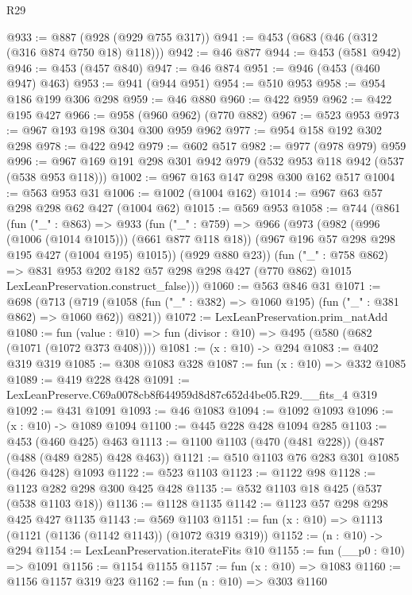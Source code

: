 \begin{lexlean}{R29}
\begin{coremodule}
@933 := @887 (@928 (@929 @755 @317))
@941 := @453 (@683 (@46 (@312 (@316 @874 @750 @18) @118)))
@942 := @46 @877
@944 := @453 (@581 @942)
@946 := @453 (@457 @840)
@947 := @46 @874
@951 := @946 (@453 (@460 @947) @463)
@953 := @941 (@944 @951)
@954 := @510 @953
@958 := @954 @186 @199 @306 @298
@959 := @46 @880
@960 := @422 @959
@962 := @422 @195 @427
@966 := @958 (@960 @962) (@770 @882)
@967 := @523 @953
@973 := @967 @193 @198 @304 @300 @959 @962
@977 := @954 @158 @192 @302 @298
@978 := @422 @942
@979 := @602 @517
@982 := @977 (@978 @979) @959
@996 := @967 @169 @191 @298 @301 @942 @979 (@532 @953 @118 @942 (@537 (@538 @953 @118)))
@1002 := @967 @163 @147 @298 @300 @162 @517
@1004 := @563 @953 @31
@1006 := @1002 (@1004 @162)
@1014 := @967 @63 @57 @298 @298 @62 @427 (@1004 @62)
@1015 := @569 @953
@1058 := @744
    (@861
      (fun ("_" : @863) =>
      @933
        (fun ("_" : @759) =>
        @966
          (@973
            (@982 (@996 (@1006 (@1014 @1015))) (@661 @877 @118 @18))
            (@967 @196 @57 @298 @298 @195 @427 (@1004 @195) @1015))
          (@929 @880 @23))
        (fun ("_" : @758 @862) =>
        @831
          @953
          @202
          @182
          @57
          @298
          @298
          @427
          (@770 @862)
          @1015
          LexLeanPreservation.construct_false)))
@1060 := @563 @846 @31
@1071 := @698
    (@713 (@719 (@1058 (fun ("_" : @382) => @1060 @195) (fun ("_" : @381 @862) => @1060 @62)) @821))
@1072 := LexLeanPreservation.prim_natAdd
@1080 := fun (value : @10) => fun (divisor : @10) => @495 (@580 (@682 (@1071 (@1072 @373 @408))))
@1081 := (x : @10) -> @294
@1083 := @402 @319 @319
@1085 := @308 @1083 @328
@1087 := fun (x : @10) => @332 @1085
@1089 := @419 @228 @428
@1091 := LexLeanPreserve.C69a0078cb8f644959d8d87c652d4be05.R29.__fits_4 @319
@1092 := @431 @1091
@1093 := @46 @1083
@1094 := @1092 @1093
@1096 := (x : @10) -> @1089 @1094
@1100 := @445 @228 @428 @1094 @285
@1103 := @453 (@460 @425) @463
@1113 := @1100 @1103 (@470 (@481 @228)) (@487 (@488 (@489 @285) @428 @463))
@1121 := @510 @1103 @76 @283 @301 @1085 (@426 @428) @1093
@1122 := @523 @1103
@1123 := @1122 @98
@1128 := @1123 @282 @298 @300 @425 @428
@1135 := @532 @1103 @18 @425 (@537 (@538 @1103 @18))
@1136 := @1128 @1135
@1142 := @1123 @57 @298 @298 @425 @427 @1135
@1143 := @569 @1103
@1151 := fun (x : @10) => @1113 (@1121 (@1136 (@1142 @1143)) (@1072 @319 @319))
@1152 := (n : @10) -> @294
@1154 := LexLeanPreservation.iterateFits @10
@1155 := fun (__p0 : @10) => @1091
@1156 := @1154 @1155
@1157 := fun (x : @10) => @1083
@1160 := @1156 @1157 @319 @23
@1162 := fun (n : @10) => @303 @1160

\end{coremodule}
\end{lexlean}
